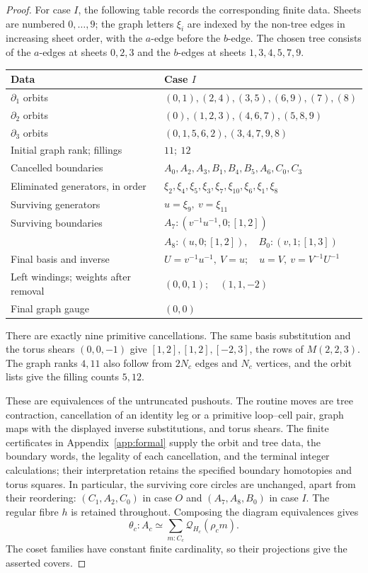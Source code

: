 \begin{proof}
For case $I$, the following table records the corresponding finite data. Sheets are numbered $0,\ldots,9$; the graph letters $\xi_i$ are indexed by the non-tree edges in increasing sheet order, with the $a$-edge before the $b$-edge. The chosen tree consists of the $a$-edges at sheets $0,2,3$ and the $b$-edges at sheets $1,3,4,5,7,9$.
\begin{center}
\small
\begin{tabular}{@{}ll@{}}
\toprule
Data & Case $I$ \\
\midrule
$\partial_1$ orbits & $(0,1),(2,4),(3,5),(6,9),(7),(8)$ \\
$\partial_2$ orbits & $(0),(1,2,3),(4,6,7),(5,8,9)$ \\
$\partial_3$ orbits & $(0,1,5,6,2),(3,4,7,9,8)$ \\
Initial graph rank; fillings & $11;\ 12$ \\
Cancelled boundaries & $A_0,A_2,A_3,B_1,B_4,B_5,A_6,C_0,C_3$ \\
Eliminated generators, in order & $\xi_2,\xi_4,\xi_5,\xi_3,\xi_7,\xi_{10},\xi_6,\xi_1,\xi_8$ \\
Surviving generators & $u=\xi_9,\ v=\xi_{11}$ \\
Surviving boundaries & $A_7:(v^{-1}u^{-1},0;[1,2])$ \\
 & $A_8:(u,0;[1,2]),\quad B_0:(v,1;[1,3])$ \\
Final basis and inverse & $U=v^{-1}u^{-1},\ V=u;\quad u=V,\ v=V^{-1}U^{-1}$ \\
Left windings; weights after removal & $(0,0,1);\quad(1,1,-2)$ \\
Final graph gauge & $(0,0)$ \\
\bottomrule
\end{tabular}
\end{center}
There are exactly nine primitive cancellations. The same basis substitution and the torus shears $(0,0,-1)$ give $[1,2],[1,2],[-2,3]$, the rows of $M(2,2,3)$. The graph ranks $4,11$ also follow from $2N_c$ edges and $N_c$ vertices, and the orbit lists give the filling counts $5,12$.

These are equivalences of the untruncated pushouts. The routine moves are tree contraction, cancellation of an identity leg or a primitive loop--cell pair, graph maps with the displayed inverse substitutions, and torus shears. The finite certificates in Appendix~\ref{app:formal} supply the orbit and tree data, the boundary words, the legality of each cancellation, and the terminal integer calculations; their interpretation retains the specified boundary homotopies and torus squares. In particular, the surviving core circles are unchanged, apart from their reordering: $(C_1,A_2,C_0)$ in case $O$ and $(A_7,A_8,B_0)$ in case $I$. The regular fibre $h$ is retained throughout. Composing the diagram equivalences gives
\[
\theta_c:A_c\simeq\sum_{m:C_c}\mathcal Q_{H_c}(\rho_c m).
\]
The coset families have constant finite cardinality, so their projections give the asserted covers.
\end{proof}

